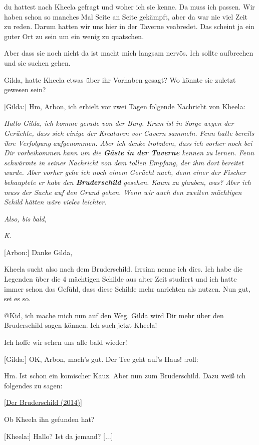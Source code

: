 \documentclass[10pt, a4paper, oneside]{book}
\newcommand{\refstorytext}[1]{\hyperref[Storytext: #1]{#1}}
\begin{document}
\begin{multicols}{2}
du hattest nach Kheela gefragt und woher ich sie kenne. Da muss ich passen. Wir haben schon so manches Mal Seite an Seite gekämpft, aber da war nie viel Zeit zu reden. Darum hatten wir uns hier in der Taverne veabredet. Das scheint ja ein guter Ort zu sein um ein wenig zu quatschen.

Aber dass sie noch nicht da ist macht mich langsam nervös. Ich sollte aufbrechen und sie suchen gehen.

Gilda, hatte Kheela etwas über ihr Vorhaben gesagt? Wo könnte sie zuletzt gewesen sein?


[Gilda:] Hm, Arbon, ich erhielt vor zwei Tagen folgende Nachricht von Kheela:

\textit{Hallo Gilda, ich komme gerade von der Burg. Kram ist in Sorge wegen der Gerüchte, dass sich einige der Kreaturen vor Cavern sammeln. Fenn hatte bereits ihre Verfolgung aufgenommen. Aber ich denke trotzdem, dass ich vorher noch bei Dir vorbeikommen kann um die \textbf{Gäste in der Taverne} kennen zu lernen. Fenn schwärmte in seiner Nachricht von dem tollen Empfang, der ihm dort bereitet wurde. Aber vorher gehe ich noch einem Gerücht nach, denn einer der Fischer behauptete er habe den \textbf{Bruderschild} gesehen. Kaum zu glauben, was? Aber ich muss der Sache auf den Grund gehen. Wenn wir auch den zweiten mächtigen Schild hätten wäre vieles leichter.}

\textit{Also, bis bald,}

\textit{K.}

[Arbon:] Danke Gilda,

Kheela sucht also nach dem Bruderschild. Irrsinn nenne ich dies. Ich habe die Legenden über die 4 mächtigen Schilde aus alter Zeit studiert und ich hatte immer schon das Gefühl, dass diese Schilde mehr anrichten als nutzen. Nun gut, sei es so.

@Kid, ich mache mich nun auf den Weg. Gilda wird Dir mehr über den Bruderschild sagen können. Ich such jetzt Kheela!

Ich hoffe wir sehen uns alle bald wieder!

[Gilda:] OK, Arbon, mach's gut. Der Tee geht auf's Haus! :roll:

Hm. Ist schon ein komischer Kauz. Aber nun zum Bruderschild. Dazu weiß ich folgendes zu sagen:

[\refstorytext{Der Bruderschild (2014)}]

Ob Kheela ihn gefunden hat?

[Kheela:] Hallo? Ist da jemand? [...]


\end{multicols}
\end{document}
